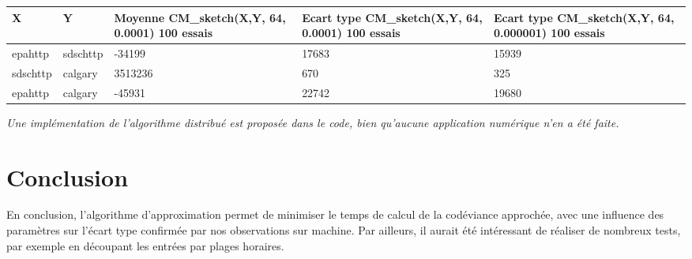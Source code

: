 \documentclass[a4paper,11pt]{article}%
\newenvironment{remarque}%
{\description\item[Remarque.]\sl}%
{\enddescription}
\begin{document}
\begin{tabularx}{\textwidth}{|l|l|X|X|X|}
      \hline X & Y & Moyenne CM\_sketch(X,Y, 64, 0.0001) 100 essais & Ecart type CM\_sketch(X,Y, 64, 0.0001) 100 essais & Ecart type CM\_sketch(X,Y, 64, 0.000001) 100 essais\\ \hline
      epahttp & sdschttp & -34199 & 17683 & 15939\\ \hline
      sdschttp & calgary & 3513236 & 670 & 325\\ \hline
      epahttp & calgary & -45931  & 22742 & 19680\\ \hline
\end{tabularx}

\begin{remarque}
 Une implémentation de l'algorithme distribué est proposée dans le code, bien qu'aucune application numérique n'en a été faite. 

\end{remarque}

\section{Conclusion}

En conclusion, l'algorithme d'approximation permet de minimiser le temps de calcul de la codéviance approchée, avec une influence des paramètres sur l'écart type confirmée par nos observations sur machine. \newline Par ailleurs, il aurait été intéressant de réaliser de nombreux tests, par exemple en découpant les entrées par plages horaires.
\end{document}
